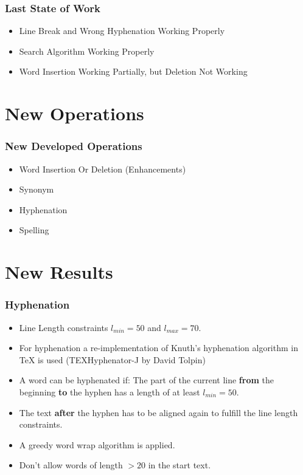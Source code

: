 \documentclass{beamer}
\begin{document}
\begin{frame}
\frametitle{Last State of Work}
\begin{itemize}
\item Line Break and Wrong Hyphenation Working Properly
\item Search Algorithm Working Properly
\item Word Insertion Working Partially, but Deletion Not Working
\end{itemize}
\end{frame}

\section{New Operations}
\begin{frame}
\frametitle{New Developed Operations}
\begin{itemize}
	\item Word Insertion Or Deletion (Enhancements)
	\item Synonym
	\item Hyphenation
	\item Spelling
\end{itemize}
\end{frame}

\section{New Results}

\begin{frame}
\frametitle{Hyphenation}


\begin{itemize}
\item Line Length constraints $l_{min}=50$ and $l_{max}=70.$



\item For hyphenation a re-implementation of Knuth's hyphenation algorithm in
TeX is used (TEXHyphenator-J by David Tolpin) 

\item A word can be hyphenated if: The part of the current line \textbf{from} the beginning \textbf{to} the hyphen has a length of at least $l_{min}=50.$

\item The text \textbf{after} the hyphen has to be aligned again to fulfill the line length
constraints.



\item A greedy word wrap algorithm is applied. 

\item Don't allow words of length $>20$ in the start text.
\end{itemize}

\end{frame}
\end{document}
